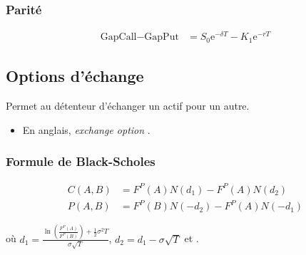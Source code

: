 \documentclass[10pt, french]{article}
\begin{document}
\begin{multicols*}{2}
\subsubsection*{Parité}
\begin{align*}
	\text{GapCall}	-	\text{GapPut}
	&=	S_{0}\textrm{e}^{-\delta T}	-	K_{1}\textrm{e}^{-rT}
\end{align*}

\columnbreak
\subsection*{Options d'échange}
\begin{definitionNOHFILL}
Permet au détenteur d'échanger un actif pour un autre.

\tcbline

\begin{itemize}[leftmargin = *]
	\item	En anglais, \og \textit{exchange option} \fg{}.
\end{itemize}
\end{definitionNOHFILL}

\subsubsection*{Formule de Black-Scholes}
\begin{align*}
	C(A, B)
	&=	F^{P}(A)N(d_{1})	-	F^{P}(A)N(d_{2})	\\
	P(A, B)
	&=	F^{P}(B)N(-d_{2})	-	F^{P}(A)N(-d_{1})	
\end{align*}

où $d_{1}	=	\frac{\ln\left(\frac{F^{P}(A)}{F^{P}(B)}\right) + \frac{1}{2} \sigma^{2} T}{\sigma \sqrt{T}}$, $d_{2}	=	d_{1} - \sigma \sqrt{T}$ et .

\end{multicols*}

\end{document}
